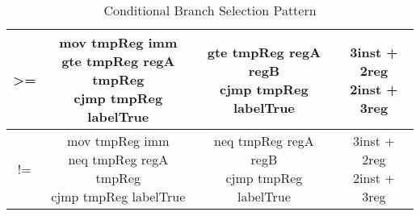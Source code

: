 \begin{table}[!ht]
{\begin{tabular}{|c|c|c|c|}
            >= & \makecell{mov tmpReg imm \\ gte tmpReg regA tmpReg \\ cjmp tmpReg labelTrue} & \makecell{gte tmpReg regA regB \\ cjmp tmpReg labelTrue} & \makecell{3inst + 2reg \\ 2inst + 3reg} \\ \hline
            != & \makecell{mov tmpReg imm \\ neq tmpReg regA tmpReg \\ cjmp tmpReg labelTrue} & \makecell{neq tmpReg regA regB \\ cjmp tmpReg labelTrue} & \makecell{3inst + 2reg \\ 2inst + 3reg} \\ \hline
        \end{tabular}}
    \caption{Conditional Branch Selection Pattern}
    \label{table:conditional-branch-pattern}
\end{table}